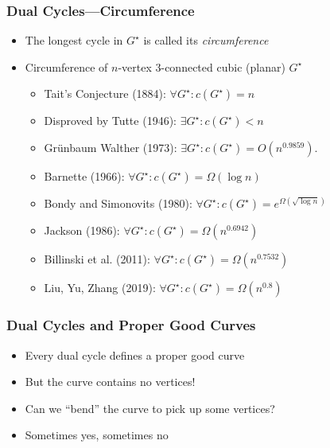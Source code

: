 \documentclass[xcolor=dvipsnames]{beamer}
\newcommand{\dual}[1]{#1^\star}
\begin{document}
\begin{frame}
   \frametitle{Dual Cycles---Circumference}

   \begin{itemize}[<+->]
      \item The longest cycle in $\dual{G}$ is called its \emph{circumference} 
      \item Circumference of $n$-vertex 3-connected cubic (planar) $\dual{G}$
      \begin{itemize}
        \item Tait's Conjecture (1884): $\forall \dual{G}: c(\dual{G}) = n$
        \item Disproved by Tutte (1946): $\exists \dual{G}: c(\dual{G})< n$
        \item Gr\"unbaum Walther (1973): $\exists \dual{G}: c(\dual{G}) = O(n^{0.9859})$.
        \item Barnette (1966): $\forall \dual{G}: c(\dual{G})=\Omega(\log n)$
        \item Bondy and Simonovits (1980): $\forall \dual{G}: c(\dual{G})=e^{\Omega(\sqrt{\log n})}$
        \item Jackson (1986): $\forall \dual{G}: c(\dual{G}) = \Omega(n^{0.6942})$
        \item Billinski et al. (2011): $\forall \dual{G}: c(\dual{G}) = \Omega(n^{0.7532})$
        \item Liu, Yu, Zhang (2019): $\forall \dual{G}: c(\dual{G}) = \Omega(n^{0.8})$
      \end{itemize}
   \end{itemize}
\end{frame}

\begin{frame}
   \frametitle{Dual Cycles and Proper Good Curves}

   \begin{itemize}[<+->]
      \item Every dual cycle defines a proper good curve
      \item But the curve contains no vertices!
      \item Can we ``bend'' the curve to pick up some vertices?
      \item Sometimes yes, sometimes no
      \begin{center}
      \end{center}
   \end{itemize}
\end{frame}
\end{document}
